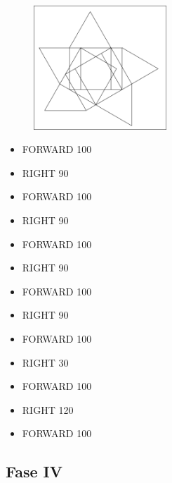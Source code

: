 \begin{minipage}{0.5\textwidth}
\begin{figure}[H]
   \includegraphics[width=5.0cm,trim=4 4 6 4,clip]{./images/marta/mar-3.png}
   \label{mar-3}
\end{figure}
\end{minipage} \hfill
\begin{minipage}{0.45\textwidth}
\begin{itemize}[itemsep=-3pt,parsep=2pt]
\item[] \hspace{0.5cm} FORWARD 100
\item[] \hspace{0.5cm} RIGHT 90
\item[] \hspace{0.5cm} FORWARD 100
\item[] \hspace{0.5cm} RIGHT 90
\item[] \hspace{0.5cm} FORWARD 100
\item[] \hspace{0.5cm} RIGHT 90
\item[] \hspace{0.5cm} FORWARD 100
\item[] \hspace{0.5cm} RIGHT 90
\item[] \hspace{0.5cm} FORWARD 100
\item[] \hspace{0.5cm} RIGHT 30
\item[] \hspace{0.5cm} FORWARD 100
\item[] \hspace{0.5cm} RIGHT 120
\item[] \hspace{0.5cm} FORWARD 100
\end{itemize}
\end{minipage}

\subsection{Fase IV}

